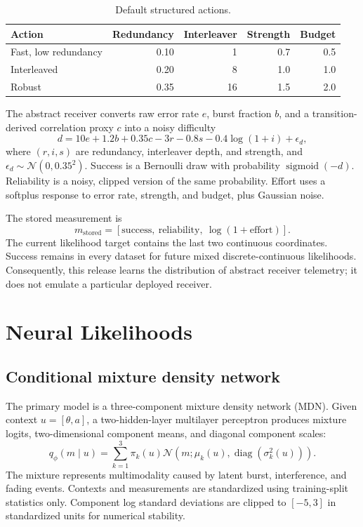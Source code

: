 \documentclass[10pt]{article}
\newcommand{\N}{\mathcal{N}}
\begin{document}
\begin{table}[h]
\centering
\small
\caption{Default structured actions.}
\label{tab:actions}
\begin{tabular}{lrrrr}
\toprule
Action & Redundancy & Interleaver & Strength & Budget \\
\midrule
Fast, low redundancy & 0.10 & 1 & 0.7 & 0.5 \\
Interleaved & 0.20 & 8 & 1.0 & 1.0 \\
Robust & 0.35 & 16 & 1.5 & 2.0 \\
\bottomrule
\end{tabular}
\end{table}

The abstract receiver converts raw error rate $e$, burst fraction $b$, and a transition-derived correlation proxy $c$ into a noisy difficulty
\begin{equation}
 d = 10e+1.2b+0.35c-3r-0.8s-0.4\log(1+i)+\epsilon_d,
 \label{eq:difficulty}
\end{equation}
where $(r,i,s)$ are redundancy, interleaver depth, and strength, and $\epsilon_d\sim\N(0,0.35^2)$. Success is a Bernoulli draw with probability $\operatorname{sigmoid}(-d)$. Reliability is a noisy, clipped version of the same probability. Effort uses a softplus response to error rate, strength, and budget, plus Gaussian noise.

The stored measurement is
\begin{equation}
  m_{\mathrm{stored}}=[\text{success},\ \text{reliability},\ \log(1+\text{effort})].
\end{equation}
The current likelihood target contains the last two continuous coordinates. Success remains in every dataset for future mixed discrete-continuous likelihoods. Consequently, this release learns the distribution of abstract receiver telemetry; it does not emulate a particular deployed receiver.

\section{Neural Likelihoods}

\subsection{Conditional mixture density network}

The primary model is a three-component mixture density network (MDN). Given context $u=[\theta,a]$, a two-hidden-layer multilayer perceptron produces mixture logits, two-dimensional component means, and diagonal component scales:
\begin{equation}
 q_\phi(m\mid u)=\sum_{k=1}^{3}\pi_k(u)
 \N\!\left(m;\mu_k(u),\operatorname{diag}(\sigma_k^2(u))\right).
 \label{eq:mdn}
\end{equation}
The mixture represents multimodality caused by latent burst, interference, and fading events. Contexts and measurements are standardized using training-split statistics only. Component log standard deviations are clipped to $[-5,3]$ in standardized units for numerical stability.
\end{document}
